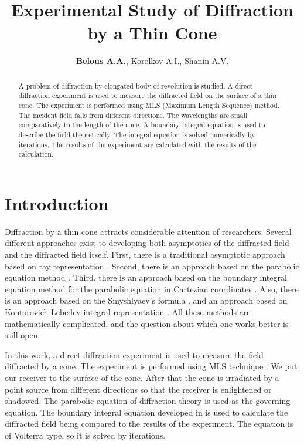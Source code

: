 \documentclass{procDDs}
\title{Experimental Study of Diffraction by a Thin Cone}
\author{\textbf{Belous A.A.}, Korolkov A.I., Shanin A.V.}%
{Faculty of Physics, Lomonosov Moscow State University, Russia}                 %
{artem.belous@gmail.com}                                   %
\begin{document}
\maketitle


\begin{abstract}   
   A problem of diffraction by elongated body of revolution is studied. A direct diffraction experiment is used to measure the diffracted field on the surface of a thin cone. The experiment is performed using MLS (Maximum Length Sequence) method. The incident field falls from different directions. The wavelengths are small comparatively to the length of the cone. A boundary integral equation is used to describe the field theoretically. The integral equation is solved numerically by iterations. The results of the experiment are calculated with the results of the calculation.
\end{abstract}

\section{Introduction}

   Diffraction by a thin cone  attracts considerable attention of researchers. Several different approaches exist to developing both asymptotics of the diffracted field and the diffracted field itself. First, there is a traditional asymptotic approach based on ray representation \cite{Popov}. Second, there is an approach based on the parabolic equation method \cite{Andronov}. Third, there is an approach based on the boundary integral equation method for the parabolic equation in Cartezian coordinates \cite{Shanin1}. Also, there is an approach based on the Smyshlyaev's formula \cite{Smychlyaev}, and an approach based on Kontorovich-Lebedev  integral representation \cite{Lyalinov}. All these methods are mathematically complicated, and the question about which one works better is still open.
   
   In this work, a direct diffraction experiment is used to measure the field diffracted by a cone. The experiment is performed using MLS technique \cite{Shanin}. We put our receiver to the surface of the cone. After that the cone is irradiated by a point source from different directions so that the receiver is enlightened or shadowed. The parabolic equation of diffraction theory is used as the governing equation. The boundary integral equation developed in \cite{Shanin_parabolic} is used to calculate the diffracted field being compared to the results of the experiment. The equation is of Volterra type, so it is solved by iterations.
   
\end{document}
